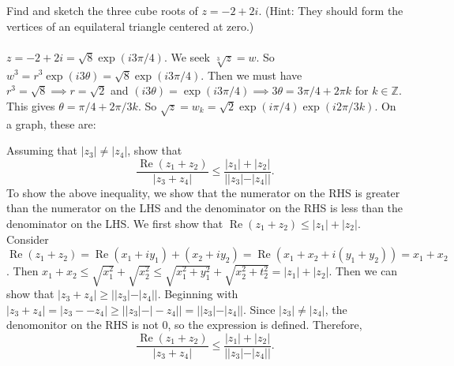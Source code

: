 \documentclass[11pt]{exam}
\newcommand{\Z}{\mathbb{Z}}
\DeclareMathOperator{\re}{Re}
\begin{document}
\begin{questions}
\question Find and sketch the three cube roots of $z=-2+2i$. (Hint:
They should form the vertices of an equilateral triangle centered at
zero.) \\\\
$z = -2 + 2i = \sqrt{8} \exp (i3\pi /4)$.
We seek $\sqrt[3]{z} = w$.
So $w^3 = r^3 \exp (i3\theta) = \sqrt{8} \exp (i3\pi /4)$.
Then we must have $r^3 = \sqrt{8} \implies r = \sqrt{2}$ and $(i3\theta) = \exp (i3\pi /4) \implies 3\theta = 3\pi /4 + 2\pi k$ for $k \in \Z$.
This gives $\theta  = \pi /4 + 2\pi /3 k$.
So $\sqrt{z} = w_k = \sqrt{2} \exp(i\pi /4) \exp (i2\pi /3k)$.
On a graph, these are:

\begin{center}
\end{center}

\question Assuming that $|z_3| \ne |z_4|$, show that
\[
  \frac{ \re(z_1+z_2)}{|z_3+z_4|} \le \frac{|z_1| +
    |z_2|}{||z_3|-|z_4||}.
\]
To show the above inequality, we show that the numerator on the RHS is greater than the numerator on the LHS and the denominator on the RHS is less than the denominator on the LHS.
We first show that $\re (z_1 + z_2) \leq |z_1| + |z_2|$.
Consider $\re (z_1 + z_2) = \re (x_1 + iy_1) + (x_2 + iy_2) = \re (x_1 + x_2 + i(y_1 + y_2)) = x_1 + x_2$.
Then $x_1 + x_2 \leq \sqrt{x_1^2} + \sqrt{x_2^2} \leq \sqrt{x_1^2 + y_1^2} + \sqrt{x_2^2 + t_2^2} = |z_1| + |z_2|$.
Then we can show that $|z_3 + z_4| \geq ||z_3| - |z_4||$.
Beginning with $|z_3 + z_4| = |z_3 - -z_4| \geq ||z_3| - |-z_4|| = ||z_3| - |z_4||$.
Since $|z_3| \ne |z_4|$, the denomonitor on the RHS is not 0, so the expression is defined.
Therefore,
\[
  \frac{ \re(z_1+z_2)}{|z_3+z_4|} \le \frac{|z_1| +
    |z_2|}{||z_3|-|z_4||}.
\]


\end{questions}
\end{document}
